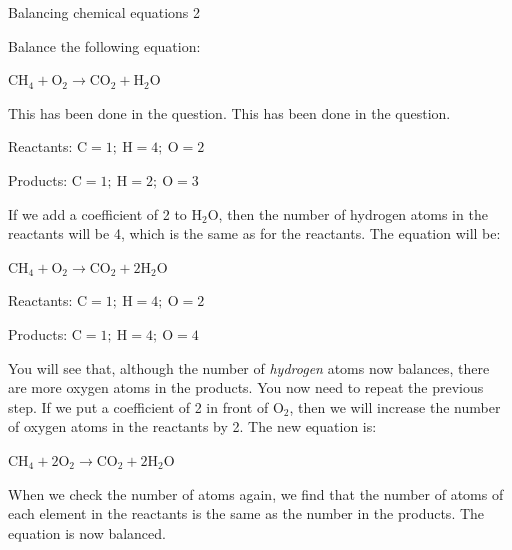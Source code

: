             \label{m38726*secfhsst!!!underscore!!!id394}
      \noindent
\begin{wex}{Balancing chemical equations 2}{Balance the following equation:
\begin{center}
${\text{CH}_{4} + \text{O}_{2} \rightarrow \text{CO}_{2} + \text{H}_{2}\text{O}}$
\end{center}
}

{ This has been done in the question.
 This has been done in the question.

Reactants: $\text{C} = 1;~ \text{H} = 4;~ \text{O} = 2$

Products: $\text{C} = 1;~ \text{H} = 2;~ \text{O} = 3$



If we add a coefficient of 2 to $\text{H}_{2}\text{O}$, then the number of hydrogen atoms in the reactants will be 4, which is the same as for the reactants. The equation will be:

\begin{center}
${\text{CH}_{4} + \text{O}_{2} \rightarrow \text{CO}_{2} + 2\text{H}_{2}\text{O}}$\\
\end{center}



Reactants: $\text{C} = 1;~ \text{H} = 4;~ \text{O} = 2$

Products: $\text{C} = 1;~ \text{H} = 4; ~\text{O} = 4$

You will see that, although the number of \textit{hydrogen} atoms now balances, there are more oxygen atoms in the products. You now need to repeat the previous step. If we put a coefficient of 2 in front of $\text{O}_{2}$, then we will increase the number of oxygen atoms in the reactants by 2. The new equation is:

\begin{center}
${\text{CH}_{4} + 2\text{O}_{2} \rightarrow \text{CO}_{2} + 2\text{H}_{2}\text{O}}$
\end{center}

When we check the number of atoms again, we find that the number of atoms of each element in the reactants is the same as the number in the products. The equation is now balanced.
}
\end{wex}
    \noindent
\label{m38726*secfhsst!!!underscore!!!id501}
